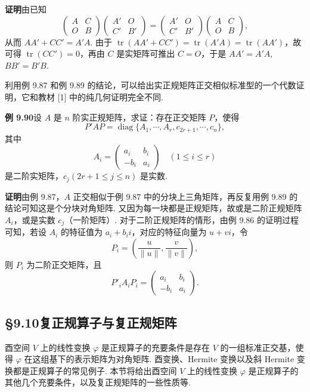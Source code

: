 \documentclass[UTF8,12pt,a4paper,fontset=fandol]{ctexart}
\begin{document}
\noindent\textbf{证明}\quad 由已知
\[
\begin{pmatrix}
A&C\\
O&B
\end{pmatrix}
\begin{pmatrix}
A'&O\\
C'&B'
\end{pmatrix}
=
\begin{pmatrix}
A'&O\\
C'&B'
\end{pmatrix}
\begin{pmatrix}
A&C\\
O&B
\end{pmatrix},
\]
从而 $AA'+CC'=A'A$. 由于 $\operatorname{tr}(AA'+CC')=\operatorname{tr}(A'A)=\operatorname{tr}(AA')$，故可得 $\operatorname{tr}(CC')=0$，再由 $C$ 是实矩阵可推出 $C=O$，于是 $AA'=A'A$, $BB'=B'B$.

利用例 9.87 和例 9.89 的结论，可以给出实正规矩阵正交相似标准型的一个代数证明，它和教材 [1] 中的纯几何证明完全不同.

\noindent\textbf{例 9.90}\quad 设 $A$ 是 $n$ 阶实正规矩阵，求证：存在正交矩阵 $P$，使得
\[
P'AP=\operatorname{diag}\{A_1,\cdots,A_r,c_{2r+1},\cdots,c_n\},
\]
其中
\[
A_i=\begin{pmatrix}
a_i&b_i\\
-b_i&a_i
\end{pmatrix}\quad (1\le i\le r)
\]
是二阶实矩阵，$c_j(2r+1\le j\le n)$ 是实数.

\noindent\textbf{证明}\quad 由例 9.87，$A$ 正交相似于例 9.87 中的分块上三角矩阵，再反复用例 9.89 的结论可知这是个分块对角矩阵. 又因为每一块都是正规矩阵，故或是二阶正规矩阵 $A_i$，或是实数 $c_j$（一阶矩阵）. 对于二阶正规矩阵的情形，由例 9.86 的证明过程可知，若设 $A_i$ 的特征值为 $a_i+b_ii$，对应的特征向量为 $u+vi$，令
\[
P_i=\left(\frac{u}{\|u\|},\frac{v}{\|v\|}\right),
\]
则 $P_i$ 为二阶正交矩阵，且
\[
P'_iA_iP_i=\begin{pmatrix}
a_i&b_i\\
-b_i&a_i
\end{pmatrix}.
\]

\subsection*{§9.10\quad 复正规算子与复正规矩阵}

酉空间 $V$ 上的线性变换 $\varphi$ 是正规算子的充要条件是存在 $V$ 的一组标准正交基，使得 $\varphi$ 在这组基下的表示矩阵为对角矩阵. 酉变换、Hermite 变换以及斜 Hermite 变换都是正规算子的常见例子. 本节将给出酉空间 $V$ 上的线性变换 $\varphi$ 是正规算子的其他几个充要条件，以及复正规矩阵的一些性质等.
\end{document}

